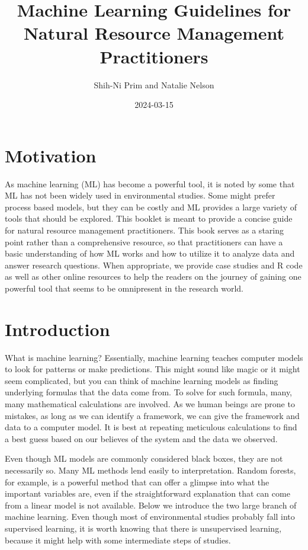 \documentclass[
]{book}
\title{Machine Learning Guidelines for Natural Resource Management Practitioners}
\author{Shih-Ni Prim and Natalie Nelson}
\date{2024-03-15}
\begin{document}
\maketitle

{
\setcounter{tocdepth}{1}
\tableofcontents
}
\hypertarget{motivation}{%
\chapter{Motivation}\label{motivation}}

As machine learning (ML) has become a powerful tool, it is noted by some that ML has not been widely used in environmental studies. Some might prefer process based models, but they can be costly and ML provides a large variety of tools that should be explored. This booklet is meant to provide a concise guide for natural resource management practitioners. This book serves as a staring point rather than a comprehensive resource, so that practitioners can have a basic understanding of how ML works and how to utilize it to analyze data and answer research questions. When appropriate, we provide case studies and R code as well as other online resources to help the readers on the journey of gaining one powerful tool that seems to be omnipresent in the research world.

\hypertarget{intro}{%
\chapter{Introduction}\label{intro}}

What is machine learning? Essentially, machine learning teaches computer models to look for patterns or make predictions. This might sound like magic or it might seem complicated, but you can think of machine learning models as finding underlying formulas that the data come from. To solve for such formula, many, many mathematical calculations are involved. As we human beings are prone to mistakes, as long as we can identify a framework, we can give the framework and data to a computer model. It is best at repeating meticulous calculations to find a best guess based on our believes of the system and the data we observed.

Even though ML models are commonly considered black boxes, they are not necessarily so. Many ML methods lend easily to interpretation. Random forests, for example, is a powerful method that can offer a glimpse into what the important variables are, even if the straightforward explanation that can come from a linear model is not available. Below we introduce the two large branch of machine learning. Even though most of environmental studies probably fall into supervised learning, it is worth knowing that there is unsupervised learning, because it might help with some intermediate steps of studies.
\end{document}
